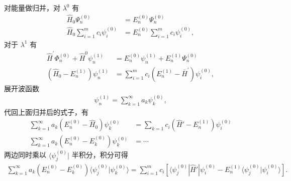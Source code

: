 对能量做归并，对 $\lambda^0$ 有
\begin{align}
    \hat H_0 \Psi_n^{(0)} &= E_n^{(0)} \Psi_n^{(0)} \\
    \hat H_0 \sum_{i=1}^m c_i \psi_i^{(0)} &= E_n^{(0)} \sum_{i=1}^m c_i \psi_i^{(0)},
\end{align}
对于 $\lambda^1$ 有
\begin{align}
    \hat{H}^{\prime} \Phi_n^{(0)}+\hat{H}^0 \psi_n^{(1)}&=E_n^{(0)} \psi_n^{(1)}+E_n^{(1)} \Psi_n^{(0)} \\
    \left(\hat{H}_0-E_n^{(1)}\right) \psi_n^{(1)}&=\sum_{i=1}^m c_i\left(E_n^{(1)}-\bar{H}^{\prime}\right) \psi_i^{(0)},
\end{align}
展开波函数
\begin{align}
    \psi_n^{(1)} = \sum_{k=1}^{\infty} a_k \psi_k^{(0)},
\end{align}
代回上面归并后的式子，有
\begin{align}
    \sum_{k=1}^{\infty} a_k (E_n^{(0)} - \hat H_0) \psi_k^{(0)} &= \sum_{k=1} c_i (\hat H' - E_n^{(1)}) \psi_i^{(0)} \\
    \sum_{k=1}^{\infty} a_k (E_n^{(0)} - E_k^{(0)}) \psi_k^{(0)} &= \cdots
\end{align}
两边同时乘以 $\langle \psi_j^{(0)} |$ 半积分，积分可得
\begin{align}
    \sum_{k=1}^{\infty} a_k (E_n^{(0)} - E_k^{(0)}) \langle \psi_j^{(0)} | \psi_k^{(0)} \rangle = \sum_{i=1}^{m} c_i \left[
        \langle \psi_j^{(0)} | \hat H' | \psi_i^{(0)}
        - E_n^{(1)} \langle \psi_j^{(0)} | \psi_i^{(0)} \rangle
    \right]. 
\end{align}

